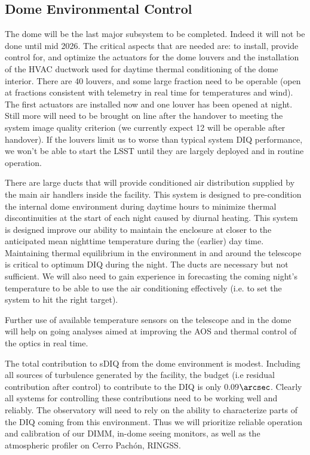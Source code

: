 \subsection{Dome Environmental Control}
The dome will be the last major subsystem to be completed. Indeed it will not be done until mid 2026. The critical aspects that are needed are: to install, provide control for, and optimize the actuators for the dome louvers and the installation of the HVAC ductwork used for daytime thermal conditioning of the dome interior. There are 40 louvers, and some large fraction need to be operable (open at fractions consistent with telemetry in real time for temperatures and wind). The first actuators are installed now and one louver has been opened at night. Still more will need to be brought on line after the handover to meeting the system image quality criterion (we currently expect 12 will be operable after handover). If the louvers limit us to worse than typical system DIQ performance, we won't be able to start the LSST until they are largely deployed and in routine operation. 

There are large ducts that will provide conditioned air distribution supplied by the main air handlers inside the facility. This system is designed to pre-condition the internal dome environment during daytime hours to minimize thermal discontinuities at the start of each night caused by diurnal heating.  This system is designed improve our ability to maintain the enclosure at closer to the anticipated mean nighttime temperature during the (earlier) day time. Maintaining thermal equilibrium in the environment in and around the telescope is critical to optimum DIQ during the night. The ducts are necessary but not sufficient. We will also need to gain experience in forecasting the coming night's temperature to be able to use the air conditioning effectively (i.e. to set the system to hit the right target). 

Further use of available temperature sensors on the telescope and in the dome will help on going analyses aimed at improving the AOS and thermal control of the optics in real time. 

The total contribution to sDIQ from the dome environment is modest. Including all sources of turbulence generated by the facility, the budget (i.e residual contribution after control) to contribute to the DIQ is only 0.09$\arcsec$. Clearly all systems for controlling these contributions need to be working well and reliably. The observatory will need to rely on the ability to characterize parts of the DIQ coming from this environment. Thus we will prioritize reliable operation and calibration of our DIMM, in-dome seeing monitors, as well as the atmospheric profiler on Cerro Pach\'{o}n, RINGSS.  


